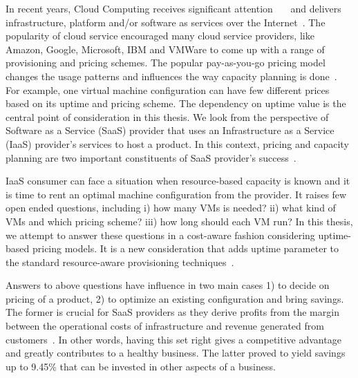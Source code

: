 \documentclass[]{final_report}
\begin{document}

In recent years, Cloud Computing receives significant attention~\cite{6185529}~\cite{5741288}~\cite{5704303} and delivers infrastructure, platform and/or software as services over the Internet~\cite{7073248}. The popularity of cloud service encouraged many cloud service providers, like Amazon, Google, Microsoft, IBM and VMWare to come up with a range of provisioning and pricing schemes. The popular pay-as-you-go pricing model changes the usage patterns and influences the way capacity planning is done~\cite{6274129}. For example, one virtual machine configuration can have few different prices based on its uptime and pricing scheme. The dependency on uptime value is the central point of consideration in this thesis. We look from the perspective of Software as a Service (SaaS) provider that uses an Infrastructure as a Service (IaaS) provider's services to host a product. In this context, pricing and capacity planning are two important constituents of SaaS provider's success~\cite{6963393}.


IaaS consumer can face a situation when resource-based capacity is known and it is time to rent an optimal machine configuration from the provider. It raises few open ended questions, including i) how many VMs is needed? ii) what kind of VMs and which pricing scheme? iii) how long should each VM run? In this thesis, we attempt to answer these questions in a cost-aware fashion considering uptime-based pricing models. It is a new consideration that adds uptime parameter to the standard resource-aware provisioning techniques~\cite{Bartolini:2014:AFC:2658949.2637480}.


Answers to above questions have influence in two main cases 1) to decide on pricing of a product, 2) to optimize an existing configuration and bring savings.  The former is crucial for SaaS providers as they derive profits from the margin between the operational costs of infrastructure and revenue generated from customers~\cite{efficient_resource_allocation}. In other words, having this set right gives a competitive advantage and greatly contributes to a healthy business. The latter proved to yield savings up to 9.45\% that can be invested in other aspects of a business.   

\end{document}
